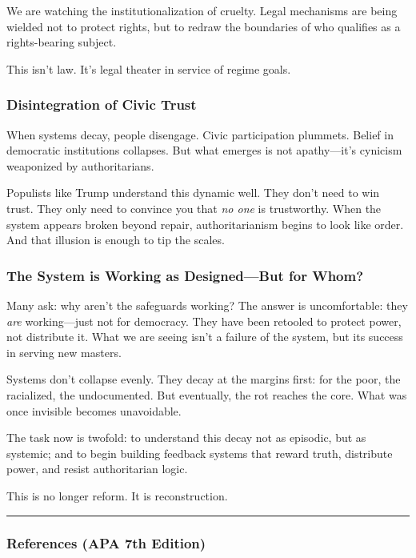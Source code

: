We are watching the institutionalization of cruelty. Legal mechanisms
are being wielded not to protect rights, but to redraw the boundaries of
who qualifies as a rights-bearing subject.

This isn't law. It's legal theater in service of regime goals.

\subsubsection{Disintegration of Civic
Trust}\label{disintegration-of-civic-trust}

When systems decay, people disengage. Civic participation plummets.
Belief in democratic institutions collapses. But what emerges is not
apathy---it's cynicism weaponized by authoritarians.

Populists like Trump understand this dynamic well. They don't need to
win trust. They only need to convince you that \emph{no one} is
trustworthy. When the system appears broken beyond repair,
authoritarianism begins to look like order. And that illusion is enough
to tip the scales.

\subsubsection{The System is Working as Designed---But for
Whom?}\label{the-system-is-working-as-designedbut-for-whom}

Many ask: why aren't the safeguards working? The answer is
uncomfortable: they \emph{are} working---just not for democracy. They
have been retooled to protect power, not distribute it. What we are
seeing isn't a failure of the system, but its success in serving new
masters.

Systems don't collapse evenly. They decay at the margins first: for the
poor, the racialized, the undocumented. But eventually, the rot reaches
the core. What was once invisible becomes unavoidable.

The task now is twofold: to understand this decay not as episodic, but
as systemic; and to begin building feedback systems that reward truth,
distribute power, and resist authoritarian logic.

This is no longer reform. It is reconstruction.

\begin{center}\rule{0.5\linewidth}{0.5pt}\end{center}

\subsubsection{References (APA 7th
Edition)}\label{references-apa-7th-edition}

